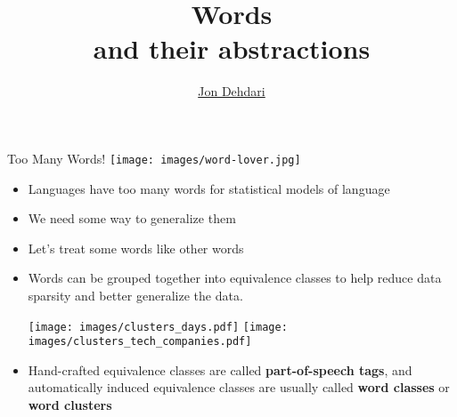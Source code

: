 \documentclass[xcolor=pdftex,x11names,table,hyperref]{beamer}
\begin{document}
\title{\LARGE{Words} \\[1.0em] \small{and their abstractions} \\[1.5em]
 }
\author{\href{http://jon.dehdari.org}{Jon Dehdari}}
\frame{\titlepage}

\begin{frame}{Too Many Words!}
	{\center \texttt{[image: images/word-lover.jpg]}}
\begin{itemize}
	\item Languages have too many words for statistical models of language
	\pause
	\item We need some way to generalize them
	\pause
	\item Let's treat some words like other words
\end{itemize}
\end{frame}

\begin{frame}{}
\begin{itemize}
	\item Words can be grouped together into equivalence classes to help reduce data sparsity and better generalize the data.

\begin{center}
	\pause
	\texttt{[image: images/clusters\_days.pdf]}
	\hspace*{1.3em}%
	\texttt{[image: images/clusters\_tech\_companies.pdf]}%
\end{center}
\pause

	\item Hand-crafted equivalence classes are called \textbf{part-of-speech tags}, and automatically induced equivalence classes are usually called \textbf{word classes} or \textbf{word clusters}
\end{itemize}
\end{frame}
\end{document}
